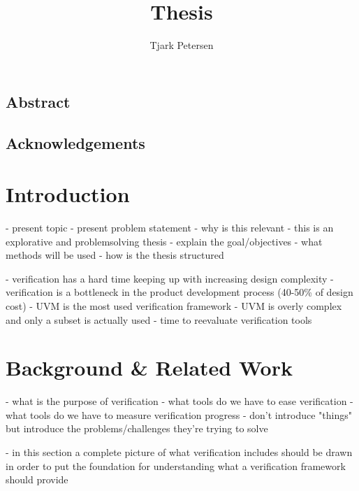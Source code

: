 \documentclass[12pt]{book}
\author{Tjark Petersen}
\title{Thesis}
\begin{document}
\maketitle

\section*{Abstract} %

\section*{Acknowledgements} %

\newpage

\tableofcontents

\chapter{Introduction} %

- present topic
- present problem statement
- why is this relevant
- this is an explorative and problemsolving thesis
- explain the goal/objectives
- what methods will be used
- how is the thesis structured

- verification has a hard time keeping up with increasing design complexity
- verification is a bottleneck in the product development process (40-50\% of design cost) \cite{mehta2018asic}
- UVM is the most used verification framework
- UVM is overly complex and only a subset is actually used \cite{sutherland2015uvm}
- time to reevaluate verification tools

\chapter{Background \& Related Work} %

- what is the purpose of verification
- what tools do we have to ease verification
- what tools do we have to measure verification progress
- don't introduce "things" but introduce the problems/challenges they're trying to solve

- in this section a complete picture of what verification includes should be drawn in order to put the foundation for
understanding what a verification framework should provide
\end{document}
